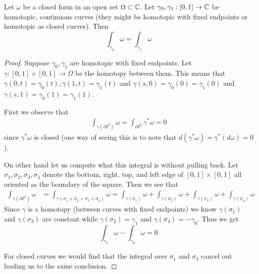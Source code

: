 \begin{theorem}\label{thm:integral-over-homotopic-curves}
Let $\omega$ be a closed form in an open set $\Omega \subset \mathbb{C}$. Let $\gamma_0, \gamma_1: [0, 1] \to \mathbb{C}$ be homotopic, continuous curves (they might be homotopic with fixed endpoints or homotopic as closed curves). Then
$$ \int_{\gamma_0} \omega = \int_{\gamma_1} \omega $$
\end{theorem}
\begin{proof}
    Suppose $\gamma_0, \gamma_1$ are homotopic with fixed endpoints. Let $\gamma: [0, 1] \times [0, 1] \to \Omega$ be the homotopy between them. This means that $\gamma(0, t) = \gamma_0(t), \gamma(1, t) = \gamma_1(t)$ and $\gamma(s, 0) = \gamma_0(0) = \gamma_1(0)$ and $\gamma(s, 1) = \gamma_0(1) = \gamma_1(1)$. 
    
    First we observe that
    \begin{align*}
        \int_{\gamma(\partial I^2)} \omega = \int_{\partial I^2} \gamma^*\omega = 0
    \end{align*}
    since $\gamma^*\omega$ is closed (one way of seeing this is to note that $d(\gamma^*\omega) = \gamma^*(d \omega) = 0$).

    On other hand let us compute what this integral is without pulling back. Let $\sigma_1, \sigma_2, \sigma_3, \sigma_4$ denote the bottom, right, top, and left edge of $[0, 1] \times [0, 1]$ all oriented as the boundary of the square. Then we see that
    \begin{align*}
        \int_{\gamma(\partial I^2)} \omega &= \int_{\gamma(\sigma_1 + \sigma_2 + \sigma_3 + \sigma_4)} \omega = \int_{\gamma(\sigma_1)} \omega + \int_{\gamma(\sigma_2)} \omega + \int_{\gamma(\sigma_3)} \omega + \int_{\gamma(\sigma_4)} \omega
    \end{align*}
    Since $\gamma$ is a homotopy (between curves with fixed endpoints) we know $\gamma(\sigma_1)$ and $\gamma(\sigma_3)$ are constant while $\gamma(\sigma_2) = \gamma_1$ and $\gamma(\sigma_4) = -\gamma_0$. Thus we get
    $$\int_{\gamma_1} \omega - \int_{\gamma_0} \omega = 0$$

    For closed curves we would find that the integral over $\sigma_1$ and $\sigma_3$ cancel out leading us to the same conclusion.
\end{proof}
